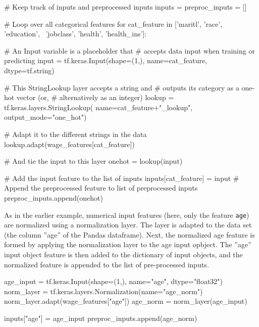 \begin{samepage}
\begin{pythoncode}
# Keep track of inputs and preprocessed inputs
inputs = {}
preproc_inputs = []

# Loop over all categorical features
for cat_feature in ['maritl', 'race', 'education', \
                    'jobclass', 'health', 'health_ins']:
               
    # An Input variable is a placeholder that
    # accepts data input when training or predicting
    input = tf.keras.Input(shape=(1,), 
       name=cat_feature, dtype=tf.string)
    
    # This StringLookup layer accepts a string and 
    # outputs its category as a one-hot vector (or, 
    # alternatively as an integer)
    lookup = tf.keras.layers.StringLookup(
        name=cat_feature+"_lookup", output_mode="one_hot")

    # Adapt it to the different strings in the data
    lookup.adapt(wage_features[cat_feature])
    
    # And tie the input to this layer
    onehot = lookup(input)
    
    # Add the input feature to the list of inputs
    inputs[cat_feature] = input
    # Append the preprocessed feature to list of preprocessed inputs
    preproc_inputs.append(onehot)
\end{pythoncode}
\end{samepage}

As in the earlier example, numerical input features (here, only the feature \texttt{age}) are normalized using a normalization layer. The layer is adapted to the data set (the column ''age'' of the Pandas dataframe). Next, the normalized age feature is formed by applying the normalization layer to the age input opbject. The ''age'' input object feature is then added to the dictionary of input objects, and the normalized feature is appended to the list of pre-processed inputs. 

\begin{samepage}
\begin{pythoncode}
age_input = tf.keras.Input(shape=(1,), name="age", dtype="float32")
norm_layer = tf.keras.layers.Normalization(name="age_norm")
norm_layer.adapt(wage_features["age"])
age_norm = norm_layer(age_input)

inputs["age"] = age_input
preproc_inputs.append(age_norm)
\end{pythoncode}
\end{samepage}

